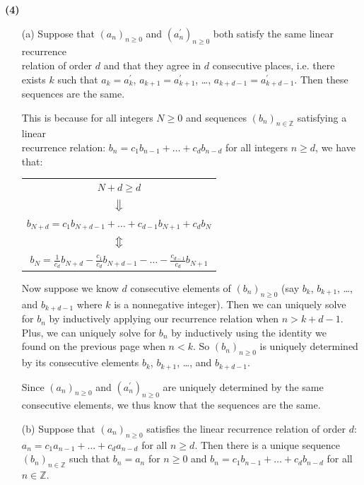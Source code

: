 \documentclass{book}
\newcommand{\exOne}{%
   \color{Purple}%
   \fontsize{13}{15}\selectfont%
}
\newenvironment{myIndent}{%
   \begin{adjustwidth}{2.5em}{0em}%
}{%
   \end{adjustwidth}%
}
\newcommand{\blab}[1]{\textbf{#1}}
\newcommand{\retTwo}{\hfill\bigbreak}
\begin{document}
\blab{(4)}
\begin{enumerate}
   \item[(a)] Suppose that $(a_n)_{n \geq 0}$ and $(a_n^\prime)_{n \geq 0}$ both satisfy the same linear recurrence\\ relation of order $d$ and that they agree in $d$ consecutive places, i.e. there exists $k$ such that $a_k = a^\prime_k$, $a_{k+1} = a^\prime_{k+1}$, \dots, $a_{k+d-1} = a^\prime_{k+d-1}$. Then these sequences are the same.
   
   \begin{myIndent}\exOne
      This is because for all integers $N \geq 0$ and sequences $(b_n)_{n \in \mathbb{Z}}$ satisfying a linear\\ recurrence relation: $b_n = c_1b_{n-1} + \ldots + c_db_{n-d}$ for all integers $n \geq d$, we have that:
         
      {\centering 
      \begin{tabular}{c}
         $N + d \geq d$ \\ $\left.\vphantom{\int}\right\Downarrow$ \\ $b_{N+d} = c_1b_{N + d - 1} + \ldots + c_{d-1}b_{N + 1} + c_db_{N}$\\ $\left.\vphantom{\int}\right\Updownarrow$ \\ $b_N = \frac{1}{c_d}b_{N + d} - \frac{c_1}{c_d}b_{N + d - 1} - \ldots - \frac{c_{d-1}}{c_d}b_{N + 1}$
      \end{tabular} \newpage\par}

      Now suppose we know $d$ consecutive elements of $(b_n)_{n \geq 0}$ (say $b_{k}$, $b_{k + 1}$, \ldots,\\ and $b_{k + d -1}$ where $k$ is a nonnegative integer). Then we can uniquely solve\\ for $b_n$ by inductively applying our recurrence relation when $n > k + d - 1$.\\ Plus, we can uniquely solve for $b_n$ by inductively using the identity we\\ found on the previous page when $n < k$. So $(b_n)_{n \geq 0}$ is uniquely determined by its consecutive elements $b_{k}$, $b_{k + 1}$, \ldots, and $b_{k + d -1}$. \retTwo

      Since $(a_n)_{n \geq 0}$ and $(a_n^\prime)_{n \geq 0}$ are uniquely determined by the same consecutive elements, we thus know that the sequences are the same.\retTwo
   \end{myIndent}

   \item[(b)] Suppose that $(a_n)_{n \geq 0}$ satisfies the linear recurrence relation of order $d$:\\ $a_n = c_1a_{n-1} + \ldots + c_da_{n-d}$ for all $n \geq d$. Then there is a unique sequence $(b_n)_{n \in \mathbb{Z}}$ such that $b_n = a_n$ for $n \geq 0$ and $b_n = c_1b_{n-1} + \ldots + c_db_{n-d}$ for all\\ $n \in \mathbb{Z}$.
   

\end{enumerate}
\end{document}
